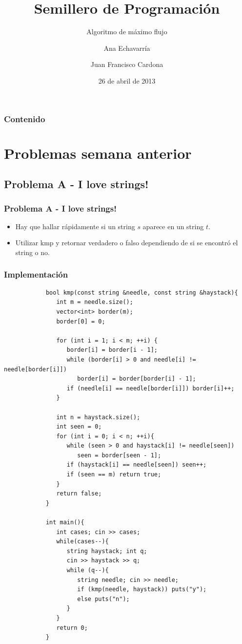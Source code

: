 \documentclass{beamer}
\title{Semillero de Programación}
\subtitle{Algoritmo de máximo flujo}
\author{Ana Echavarría \and Juan Francisco Cardona}
\institute{Universidad EAFIT}
\date{26 de abril de 2013}
\begin{document}
\begin{frame}
	\titlepage
\end{frame}

\begin{frame}
	\frametitle{Contenido}
	\tableofcontents
\end{frame}

\section[Problemas]{Problemas semana anterior}
	\subsection{Problema A - I love strings!}
	
	\begin{frame}
		\frametitle{Problema A - I love strings!}
		\begin{itemize}
			\item Hay que hallar rápidamente si un string $s$ aparece en un string $t$.
			\item Utilizar kmp y retornar verdadero o falso dependiendo de si se encontró el string o no.
		\end{itemize}
	\end{frame}
	
	\begin{frame}
		\frametitle{Implementación}
		\begin{lstlisting}
			bool kmp(const string &needle, const string &haystack){
			   int m = needle.size();
			   vector<int> border(m);
			   border[0] = 0;

			   for (int i = 1; i < m; ++i) {
			      border[i] = border[i - 1];
			      while (border[i] > 0 and needle[i] != needle[border[i]])
			         border[i] = border[border[i] - 1];
			      if (needle[i] == needle[border[i]]) border[i]++;
			   }

			   int n = haystack.size();
			   int seen = 0;
			   for (int i = 0; i < n; ++i){
			      while (seen > 0 and haystack[i] != needle[seen])
			         seen = border[seen - 1];
			      if (haystack[i] == needle[seen]) seen++;
			      if (seen == m) return true;
			   }
			   return false;
			}

			int main(){
			   int cases; cin >> cases;
			   while(cases--){
			      string haystack; int q;
			      cin >> haystack >> q;
			      while (q--){
			         string needle; cin >> needle;
			         if (kmp(needle, haystack)) puts("y");
			         else puts("n");
			      }
			   }
			   return 0;
			}
		\end{lstlisting}
	\end{frame}
	
\end{document}
